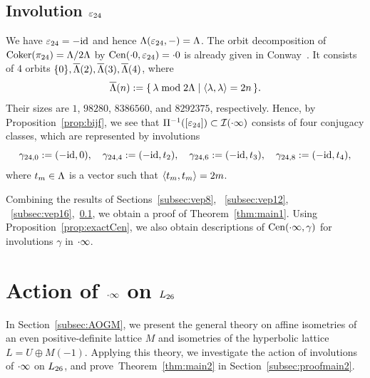 \documentclass{amsart} %
\begin{document}
\subsection{Involution $\varepsilon_{24}$}\label{subsec:vep24}
%
We have $\varepsilon_{24}=-\mathord{\mathrm{id}}$ and hence $\Lambda(\varepsilon_{24}, -)=\Lambda$.
The orbit decomposition of 
$\operatorname{Coker}(\pi_{24})=\Lambda/2\Lambda$ by $\mathrm{Cen}(\cdot 0, \varepsilon_{24})=\cdot 0$ is already given in 
Conway~\cite[Chapter 10, Section 3.3]{theCSbook}.
It consists of $4$ orbits $\{0\}, \overline{\Lambda}(2), \overline{\Lambda}(3), \overline{\Lambda}(4)$, where 
\[
 \overline{\Lambda}(n):=\{\,{\lambda\bmod 2\Lambda}\mid {\langle \lambda, \lambda \rangle=2n} \,\}.
\]
Their sizes are $1$, $98280$, $8386560$, and $8292375$, respectively.
Hence, by Proposition~\ref{prop:bijf}, we see that 
$\Pi^{-1} ([\varepsilon_{24}])\subset \mathord{\mathcal{I}}(\cdot \infty)$ consists of four conjugacy classes,
 which are 
 represented by involutions
 \[
\gamma_{24, 0}:=(-\mathord{\mathrm{id}}, 0),
\quad
\gamma_{24, 4}:=(-\mathord{\mathrm{id}}, t_2),
\quad
\gamma_{24, 6}:=(-\mathord{\mathrm{id}}, t_3),
\quad
\gamma_{24, 8}:=(-\mathord{\mathrm{id}}, t_4),
 \]
where $t_m\in \Lambda$ is a vector such that
$\langle  t_m, t_m \rangle=2m$.
%
\par
\medskip
Combining the results of Sections~\ref{subsec:vep8}, ~\ref{subsec:vep12}, ~\ref{subsec:vep16},~\ref{subsec:vep24},
we obtain a proof of Theorem~\ref{thm:main1}.
Using Proposition~\ref{prop:exactCen}, we also obtain descriptions of $\mathrm{Cen}(\cdot \infty, \gamma)$
for involutions $\gamma$ in $\cdot \infty$.
%
%
\section{Action of $\cdot \infty$ on $L_{26}$}\label{sec:proofThm2}
%
In Section~\ref{subsec:AOGM}, 
we present the general theory on affine isometries of an even positive-definite lattice $M$
and isometries of the hyperbolic lattice $L=U\oplus M(-1)$.
Applying this theory,
we investigate the action of involutions of $\cdot \infty$ on $L_{26}$,
and prove~Theorem~\ref{thm:main2} in Section~\ref{subsec:proofmain2}.
%
%
\end{document}
